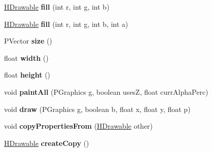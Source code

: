 \begin{DoxyCompactItemize}
\item 
\hypertarget{classhype_1_1drawable_1_1_h_stage_a55c66dfd278df300fcb6c96988dbb4da}{\hyperlink{classhype_1_1drawable_1_1_h_drawable}{H\-Drawable} {\bfseries fill} (int r, int g, int b)}\label{classhype_1_1drawable_1_1_h_stage_a55c66dfd278df300fcb6c96988dbb4da}

\item 
\hypertarget{classhype_1_1drawable_1_1_h_stage_a8ac704c5f91e673b1c7786be8cc398fd}{\hyperlink{classhype_1_1drawable_1_1_h_drawable}{H\-Drawable} {\bfseries fill} (int r, int g, int b, int a)}\label{classhype_1_1drawable_1_1_h_stage_a8ac704c5f91e673b1c7786be8cc398fd}

\item 
\hypertarget{classhype_1_1drawable_1_1_h_stage_a4d1a4833d6ab9bcfdce2f5a0d534d1ef}{P\-Vector {\bfseries size} ()}\label{classhype_1_1drawable_1_1_h_stage_a4d1a4833d6ab9bcfdce2f5a0d534d1ef}

\item 
\hypertarget{classhype_1_1drawable_1_1_h_stage_ae31a077cefbeb64d9d90cf109a3f01d9}{float {\bfseries width} ()}\label{classhype_1_1drawable_1_1_h_stage_ae31a077cefbeb64d9d90cf109a3f01d9}

\item 
\hypertarget{classhype_1_1drawable_1_1_h_stage_a1fb08f04ae51f7e7f223a1f402d59803}{float {\bfseries height} ()}\label{classhype_1_1drawable_1_1_h_stage_a1fb08f04ae51f7e7f223a1f402d59803}

\item 
\hypertarget{classhype_1_1drawable_1_1_h_stage_ae6db64ce43f05d2ccd8483d5ac6fb7b0}{void {\bfseries paint\-All} (P\-Graphics g, boolean uses\-Z, float curr\-Alpha\-Perc)}\label{classhype_1_1drawable_1_1_h_stage_ae6db64ce43f05d2ccd8483d5ac6fb7b0}

\item 
\hypertarget{classhype_1_1drawable_1_1_h_stage_af831388904234d126dc8f5c4f2c3eb25}{void {\bfseries draw} (P\-Graphics g, boolean b, float x, float y, float p)}\label{classhype_1_1drawable_1_1_h_stage_af831388904234d126dc8f5c4f2c3eb25}

\item 
\hypertarget{classhype_1_1drawable_1_1_h_stage_a69b751bec2dcc691dd73c88945bb3f84}{void {\bfseries copy\-Properties\-From} (\hyperlink{classhype_1_1drawable_1_1_h_drawable}{H\-Drawable} other)}\label{classhype_1_1drawable_1_1_h_stage_a69b751bec2dcc691dd73c88945bb3f84}

\item 
\hypertarget{classhype_1_1drawable_1_1_h_stage_aa7e644b2063eda66b2860a8d60ba124f}{\hyperlink{classhype_1_1drawable_1_1_h_drawable}{H\-Drawable} {\bfseries create\-Copy} ()}\label{classhype_1_1drawable_1_1_h_stage_aa7e644b2063eda66b2860a8d60ba124f}


\end{DoxyCompactItemize}
